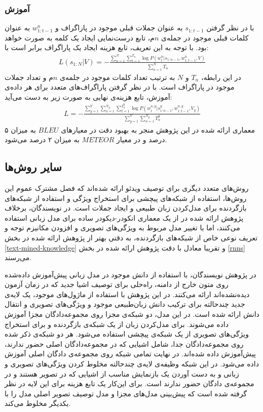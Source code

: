 \subsubsection{آموزش}
با در نظر گرفتن $s_{1:t-1}$ به عنوان جملات قبلی موجود در پاراگراف و $w_{1:t-1}^n$ به عنوان کلمات قبلی موجود در جمله‌ی $n$م، تابع درست‌نمایی ایجاد یک کلمه به صورت
خواهد بود. با توجه به این تعریف، تابع هزینه ایجاد یک پاراگراف برابر است با:
\begin{align*}
	L(s_{1:N}|V) = - \frac{\sum_{n=1}^{N}\sum_{t=1}^{T_n}\log P(w_t^n|s_{1:n-1}, w_{1:t-1}^n, V) }{\sum_{n=1}^{N}T_n}
\end{align*}
در این رابطه، $T_n$ و $N$ به ترتیب تعداد کلمات موجود در جلمه‌ی $n$م و تعداد جملات موجود در پاراگراف است. با در نظر گرفتن پاراگراف‌های متعدد برای هر داده‌ی آموزش، تابع هزینه‌ی نهایی به صورت زیر به دست می‌آید:
\begin{align*}
	L = -\frac{\sum_{y=1}^{Y}\sum_{n=1}^{N_y}\sum_{t=1}^{T_n^y} \log P(w_t^{n, y}|s_{1:n-1}^y, w_{1:t-1}^{n, y}, V_y) }{{\sum_{y=1}^{Y}\sum_{n=1}^{N_y}T_n^y}}
\end{align*}
معماری ارائه شده در این پژوهش منجر به بهبود دقت در معیارهای
 $BLEU$
به میزان ۵ درصد و در معیار $METEOR$ به میزان ۲ درصد می‌شود.
\subsection{سایر روش‌ها}\label{other}
روش‌های متعدد دیگری برای توصیف ویدئو ارائه شده‌اند که فصل مشترک عموم این روش‌ها، استفاده از شبکه‌های پیچشی برای استخراج ویژگی و استفاده از شبکه‌های بازگردنده برای مدل‌کردن زبان طبیعی و ایجاد جملات است. در 
\cite{Pan2015}
نویسندگان، برخلاف پژوهش ارائه شده در 
\cite{Donahue2015}
از یک معماری انکودر-دیکودر ساده برای مدل زبانی استفاده می‌کنند، اما با تغییر مدل مربوط به ویژگی‌های تصویری و افزودن مکانیزم توجه و تعریف نوعی خاص از شبکه‌های بازگردنده، به دقتی بهتر از پژوهش ارائه شده در بخش
\ref{text-mined-knowledge}
و تقریبا معادل با دقت پژوهش ارائه شده در بخش \ref{rnns} می‌رسند.

در پژوهش 
\cite{Hendricks2016}
نویسندگان، با استفاده از دانش موجود در مدل زبانی پیش‌آموزش داده‌شده روی متون خارج از دامنه، راه‌حلی برای توصیف اشيا جدید که در زمان آزمون دیده‌نشده‌اند ارائه می‌کنند. در این پژوهش با استفاده از ماژول‌های موجود، یک لایه‌ی جدید چند‌حالته برای ترکیب دانش زبان‌طبیعی موجود و ویژگی‌های تصویری و انتقال دانش 
 ارائه شده است. در این مدل، دو شبکه‌ی مجزا روی مجموعه‌دادگان مجزا آموزش داده می‌شوند. برای مدل‌کردن زبان از یک شبکه‌ی بازگردنده و برای استخراج ویژگی‌های تصویری از یک شبکه‌ی پیچشی استفاده می‌شود. هر دو شبکه‌ی ذکر شده روی مجموعه‌دادگان جدا، شامل اشيا‌یی که در مجموعه‌دادگان اصلی حضور ندارند، پیش‌آموزش داده شده‌اند. در نهایت تمامی شبکه روی مجموعه‌ی دادگان اصلی آموزش داده می‌شود. در این شبکه وظیفه‌ی لایه‌ی چندحالته مخلوط کردن ویژگی‌های تصویری و زبانی و به دست آوردن یک‌ باز‌نمایش مناسب از اشیایی که در تصویر هستند و در مجموعه‌ی دادگان حضور ندارند است. برای این‌کار یک تابع هزینه‌ برای این لایه در نظر گرفته شده است که پیش‌بینی مدل‌های مجزا و مدل توصیف تصویر اصلی مدل را با یکدیگر مخلوط می‌کند.




